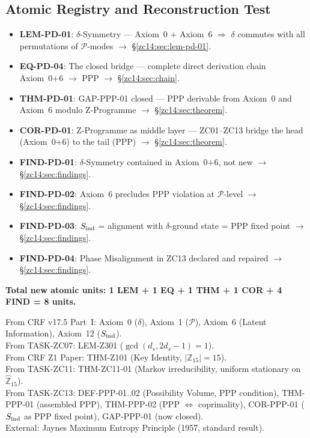 \documentclass[12pt, a4paper]{article}
\begin{document}
\subsection{Atomic Registry and Reconstruction Test}
\label{zc14:sec:registry}

\begin{formalbox}[title={Atomic units introduced by TASK-ZC14
  (5 new units)}]
\begin{itemize}[leftmargin=*]
  \item \textbf{LEM-PD-01}: $\delta$-Symmetry ---
    Axiom~0 + Axiom~6 $\Rightarrow$ $\delta$ commutes
    with all permutations of $\mathcal{P}$-modes
    $\to$ \S\ref{zc14:sec:lem-pd-01}. 
  \item \textbf{EQ-PD-04}: The closed bridge --- complete direct
    derivation chain Axiom~0+6 $\to$ PPP
    $\to$ \S\ref{zc14:sec:chain}.
  \item \textbf{THM-PD-01}: GAP-PPP-01 closed ---
    PPP derivable from Axiom~0 and Axiom~6 modulo Z-Programme
    $\to$ \S\ref{zc14:sec:theorem}. 
  \item \textbf{COR-PD-01}: Z-Programme as middle layer ---
    ZC01--ZC13 bridge the head (Axiom~0+6) to the tail (PPP)
    $\to$ \S\ref{zc14:sec:theorem}.
  \item \textbf{FIND-PD-01}: $\delta$-Symmetry contained in
    Axiom~0+6, not new $\to$ \S\ref{zc14:sec:findings}.
  \item \textbf{FIND-PD-02}: Axiom~6 precludes PPP violation
    at $\mathcal{P}$-level $\to$ \S\ref{zc14:sec:findings}.
  \item \textbf{FIND-PD-03}: $S_{\rm ind}$ = alignment with
    $\delta$-ground state = PPP fixed point
    $\to$ \S\ref{zc14:sec:findings}.
  \item \textbf{FIND-PD-04}: Phase Misalignment in ZC13
    declared and repaired $\to$ \S\ref{zc14:sec:findings}.
\end{itemize}
\textbf{Total new atomic units: 1 LEM + 1 EQ + 1 THM +
1 COR + 4 FIND = 8 units.}
\end{formalbox}

\begin{formalbox}[title={Atomic units inherited (not modified)}]
From CRF v17.5 Part~I: Axiom~0 ($\delta$), Axiom~1 ($\mathcal{P}$),
  Axiom~6 (Latent Information), Axiom~12 ($S_{\rm ind}$). \\
From TASK-ZC07: LEM-Z301 ($\gcd(d_s,2d_s{-}1)=1$). \\
From CRF Z1 Paper: THM-Z101 (Key Identity, $|\mathbb{Z}_{15}|=15$). \\
From TASK-ZC11: THM-ZC11-01 (Markov irreducibility,
  uniform stationary on $\widehat{\mathbb{Z}}_{15}$). \\
From TASK-ZC13: DEF-PPP-01..02 (Possibility Volume, PPP condition),
  THM-PPP-01 (assembled PPP), THM-PPP-02 (PPP $\Leftrightarrow$
  coprimality), COR-PPP-01 ($S_{\rm ind}$ as PPP fixed point),
  GAP-PPP-01 (now closed). \\
External: Jaynes Maximum Entropy Principle (1957, standard result).
\end{formalbox}
\end{document}
